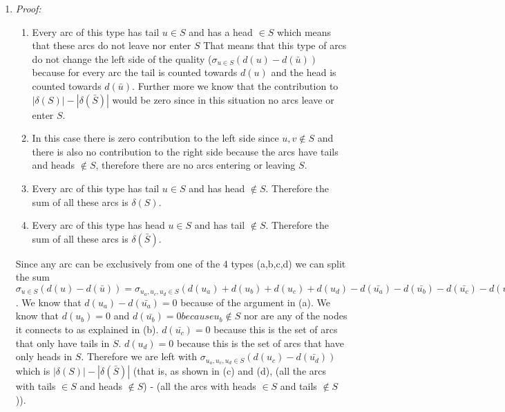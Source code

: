 \documentclass[a4paper,12pt]{article}
\begin{document}
\begin{enumerate}
\item
\emph{Proof:}
\begin{enumerate}
\item
Every arc of this type has tail $u \in S$ and has a head $\in S$ which means that these arcs do not leave nor enter $S$  That means that this type of arcs do not change the left side of the quality ($\sigma_{u \in S}(d(u) - d(\bar{u}))$ because for every arc the tail is counted towards $d(u)$ and the head is counted towards $d(\bar{u})$. Further more we know that the contribution to $|\delta(S)| - |\delta(\bar{S})|$ would be zero since in this situation no arcs leave or enter $S$. 
\item
In this case there is zero contribution to the left side since $u,v \notin S$ and there is also no contribution to the right side because the arcs have tails and heads $\notin S$, therefore there are no arcs entering or leaving $S$.
\item
Every arc of this type has tail $u \in S$ and has head $\notin S$. Therefore the sum of all these arcs is $\delta(S)$.
\item
Every arc of this type has head $u \in S$ and has tail $\notin S$. Therefore the sum of all these arcs is $\delta(\bar{S})$.
\end{enumerate}
Since any arc can be exclusively from one of the 4 types (a,b,c,d) we can split the sum $\sigma_{u \in S}(d(u) - d(\bar{u})) = \sigma_{u_a,u_c,u_d \in S}(d(u_a) + d(u_b) + d(u_c) + d(u_d) - d(\bar{u_a}) - d(\bar{u_b}) - d(\bar{u_c}) - d(\bar{u_d}))$. We know that $d(u_a) - d(\bar{u_a}) = 0$ because of the argument in (a). We know that $d(u_b) = 0$ and $d(\bar{u_b}) = 0 because u_b \notin S$ nor are any of the nodes it connects to as explained in (b). $d(\bar{u_c}) = 0$ because this is the set of arcs that only have tails in $S$. $d(u_d) = 0$ because this is the set of arcs that have only heads in $S$. Therefore we are left with $\sigma_{u_a, u_c, u_d \in S}(d(u_c) - d(\bar{u_d}))$ which is $|\delta(S)| - |\delta(\bar{S})|$ (that is, as shown in (c) and (d), (all the arcs with tails $\in S$ and heads $\notin S$) - (all the arcs with heads $\in S$ and tails $\notin S$)).   


\end{enumerate}
\end{document}
